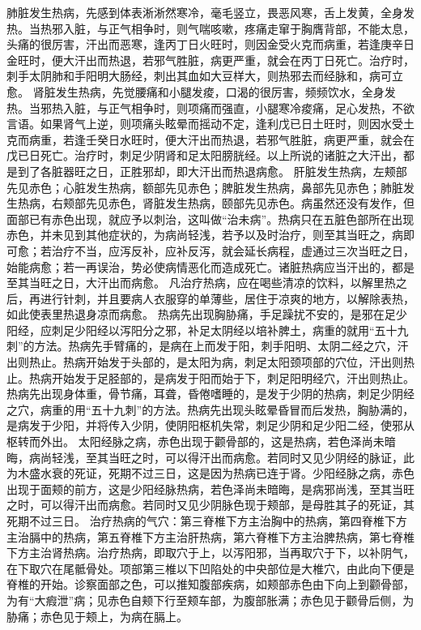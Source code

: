 \documentclass[a4paper,12pt,UTF8,twoside]{ctexbook}
\begin{document}
肺脏发生热病，先感到体表淅淅然寒冷，毫毛竖立，畏恶风寒，舌上发黄，全身发热。当热邪入脏，与正气相争时，则气喘咳嗽，疼痛走窜于胸膺背部，不能太息，头痛的很厉害，汗出而恶寒，逢丙丁日火旺时，则因金受火克而病重，若逢庚辛日金旺时，便大汗出而热退，若邪气胜脏，病更严重，就会在丙丁日死亡。治疗时，刺手太阴肺和手阳明大肠经，刺出其血如大豆样大，则热邪去而经脉和，病可立愈。
肾脏发生热病，先觉腰痛和小腿发痠，口渴的很厉害，频频饮水，全身发热。当邪热入脏，与正气相争时，则项痛而强直，小腿寒冷痠痛，足心发热，不欲言语。如果肾气上逆，则项痛头眩晕而摇动不定，逢利戊已日土旺时，则因水受土克而病重，若逢壬癸日水旺时，便大汗出而热退，若邪气胜脏，病更严重，就会在戊已日死亡。治疗时，刺足少阴肾和足太阳膀胱经。以上所说的诸脏之大汗出，都是到了各脏器旺之日，正胜邪却，即大汗出而热退病愈。
肝脏发生热病，左颊部先见赤色；心脏发生热病，额部先见赤色；脾脏发生热病，鼻部先见赤色；肺脏发生热病，右颊部先见赤色，肾脏发生热病，颐部先见赤色。病虽然还没有发作，但面部已有赤色出现，就应予以刺治，这叫做“治未病”。热病只在五脏色部所在出现赤色，并未见到其他症状的，为病尚轻浅，若予以及时治疗，则至其当旺之，病即可愈；若治疗不当，应泻反补，应补反泻，就会延长病程，虚通过三次当旺之日，始能病愈；若一再误治，势必使病情恶化而造成死亡。诸脏热病应当汗出的，都是至其当旺之日，大汗出而病愈。
凡治疗热病，应在喝些清凉的饮料，以解里热之后，再进行针刺，并且要病人衣服穿的单薄些，居住于凉爽的地方，以解除表热，如此使表里热退身凉而病愈。
热病先出现胸胁痛，手足躁扰不安的，是邪在足少阳经，应刺足少阳经以泻阳分之邪，补足太阴经以培补脾土，病重的就用“五十九刺”的方法。热病先手臂痛的，是病在上而发于阳，刺手阳明、太阴二经之穴，汗出则热止。热病开始发于头部的，是太阳为病，刺足太阳颈项部的穴位，汗出则热止。热病开始发于足胫部的，是病发于阳而始于下，刺足阳明经穴，汗出则热止。热病先出现身体重，骨节痛，耳聋，昏倦嗜睡的，是发于少阴的热病，刺足少阴经之穴，病重的用“五十九刺”的方法。热病先出现头眩晕昏冒而后发热，胸胁满的，是病发于少阳，并将传入少阴，使阴阳枢机失常，刺足少阴和足少阳二经，使邪从枢转而外出。
太阳经脉之病，赤色出现于颧骨部的，这是热病，若色泽尚未暗晦，病尚轻浅，至其当旺之时，可以得汗出而病愈。若同时又见少阴经的脉证，此为木盛水衰的死证，死期不过三日，这是因为热病已连于肾。少阳经脉之病，赤色出现于面颊的前方，这是少阳经脉热病，若色泽尚未暗晦，是病邪尚浅，至其当旺之时，可以得汗出而病愈。若同时又见少阴脉色现于颊部，是母胜其子的死证，其死期不过三日。
治疗热病的气穴：第三脊椎下方主治胸中的热病，第四脊椎下方主治膈中的热病，第五脊椎下方主治肝热病，第六脊椎下方主治脾热病，第七脊椎下方主治肾热病。治疗热病，即取穴于上，以泻阳邪，当再取穴于下，以补阴气，在下取穴在尾骶骨处。项部第三椎以下凹陷处的中央部位是大椎穴，由此向下便是脊椎的开始。诊察面部之色，可以推知腹部疾病，如颊部赤色由下向上到颧骨部，为有“大瘕泄”病；见赤色自颊下行至颊车部，为腹部胀满；赤色见于颧骨后侧，为胁痛；赤色见于颊上，为病在膈上。
\end{document}
